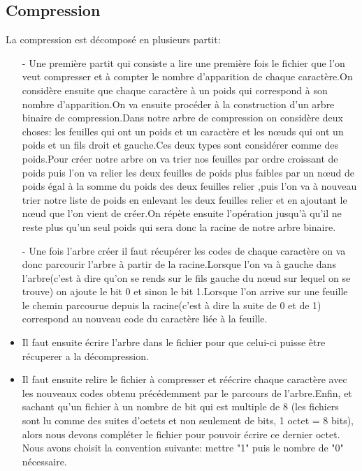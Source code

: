 \documentclass{report}
\begin{document}
\subsection*{Compression}
La compression est décomposé en plusieurs partit:
\begin{itemize}
\item[-] Une première partit qui consiste a lire une première fois le fichier que l'on veut compresser et à compter le nombre d'apparition de chaque caractère.On considère ensuite que chaque caractère à un poids qui correspond à son nombre d'apparition.On va ensuite procéder à la construction d'un arbre binaire de compression.Dans notre arbre de compression on considère deux choses: les feuilles qui ont un poids et un caractère et les nœuds qui ont un poids et un fils droit et gauche.Ces deux types sont considérer comme des poids.Pour créer notre arbre on va trier nos feuilles  par ordre croissant de poids puis l'on va relier les deux feuilles de poids plus faibles par un nœud de poids égal à la somme du poids des deux feuilles relier ,puis l'on va à nouveau trier notre liste de poids en enlevant les deux feuilles relier et en ajoutant le nœud que l'on vient de créer.On répète ensuite l'opération jusqu'à qu'il ne reste plus qu'un seul poids qui sera donc la racine de notre arbre binaire.

\item[-]Une fois l'arbre créer il faut récupérer les codes de chaque caractère on va donc parcourir l'arbre à partir de la racine.Lorsque l'on va à gauche dans l'arbre(c'est à dire qu'on se rends sur le fils gauche du nœud sur lequel on se trouve) on ajoute le bit 0 et sinon le bit 1.Lorsque l'on arrive sur une feuille le chemin parcourue depuis la racine(c'est à dire la suite de 0 et de 1) correspond au nouveau code du caractère liée à la feuille.

\item Il faut ensuite écrire l'arbre dans le fichier pour que celui-ci puisse être récuperer a la décompression.

\item Il faut ensuite relire le fichier à compresser et réécrire chaque caractère avec les nouveaux codes obtenu précédemment par le parcours de l'arbre.Enfin, et sachant qu'un fichier à un nombre de bit qui est multiple de 8 (les fichiers sont lu comme des suites d'octets et non seulement de bits, 1 octet = 8 bits), alors nous devons compléter le fichier pour pouvoir écrire ce dernier octet.
Nous avons choisit la convention suivante: mettre "1" puis le nombre de "0" nécessaire. 

\end{itemize}
\end{document}
